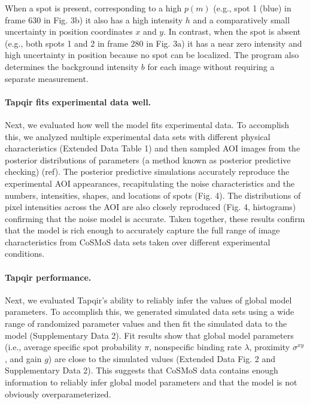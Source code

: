 When a spot is present, corresponding to a high $p(m)$ (e.g., spot 1 (blue) in frame 630 in Fig. 3b) it also has a high intensity $h$ and a comparatively small uncertainty in position coordinates $x$ and $y$. In contrast, when the spot is absent (e.g., both spots 1 and 2 in frame 280 in Fig. 3a) it has a near zero intensity and high uncertainty in position because no spot can be localized. The program also determines the background intensity $b$ for each image without requiring a separate measurement. 


\paragraph{Tapqir fits experimental data well.}
Next, we evaluated how well the model fits experimental data. To accomplish this, we analyzed multiple experimental data sets with different physical characteristics (Extended Data Table 1) and then sampled AOI images from the posterior distributions of parameters (a method known as posterior predictive checking) (ref). The posterior predictive simulations accurately reproduce the experimental AOI appearances, recapitulating the noise characteristics and the numbers, intensities, shapes, and locations of spots (Fig. 4).  The distributions of pixel intensities across the AOI are also closely reproduced (Fig. 4, histograms) confirming that the noise model is accurate. Taken together, these results confirm that the model is rich enough to accurately capture the full range of image characteristics from CoSMoS data sets taken over different experimental conditions.

\paragraph{Tapqir performance.}
Next, we evaluated Tapqir's ability to reliably infer the values of global model parameters. To  accomplish this, we generated simulated data sets  using  a wide range of randomized parameter values and then fit the simulated data to the model (Supplementary Data 2). Fit results show that global model parameters (i.e., average specific spot probability $\pi$, nonspecific binding rate $\lambda$, proximity $\sigma^{xy}$, and gain $g$) are close to the simulated values  (Extended Data Fig. 2 and Supplementary Data 2). This suggests that CoSMoS data contains enough information to reliably infer global model parameters and that the model is not obviously overparameterized.

